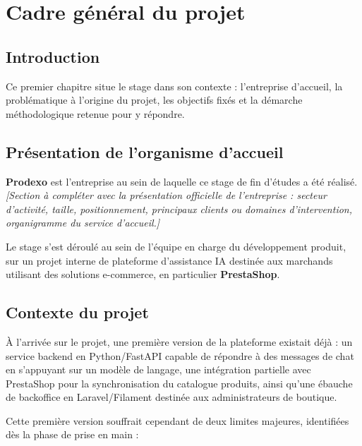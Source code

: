 \chapter{Cadre général du projet}
\label{chap:cadre-general}

\section*{Introduction}

Ce premier chapitre situe le stage dans son contexte : l'entreprise d'accueil, la problématique à l'origine du projet, les objectifs fixés et la démarche méthodologique retenue pour y répondre.

\section{Présentation de l'organisme d'accueil}

\textbf{Prodexo} est l'entreprise au sein de laquelle ce stage de fin d'études a été réalisé. \emph{[Section à compléter avec la présentation officielle de l'entreprise : secteur d'activité, taille, positionnement, principaux clients ou domaines d'intervention, organigramme du service d'accueil.]}

Le stage s'est déroulé au sein de l'équipe en charge du développement produit, sur un projet interne de plateforme d'assistance IA destinée aux marchands utilisant des solutions e-commerce, en particulier \textbf{PrestaShop}.

\section{Contexte du projet}

À l'arrivée sur le projet, une première version de la plateforme existait déjà : un service backend en Python/FastAPI capable de répondre à des messages de chat en s'appuyant sur un modèle de langage, une intégration partielle avec PrestaShop pour la synchronisation du catalogue produits, ainsi qu'une ébauche de backoffice en Laravel/Filament destinée aux administrateurs de boutique.

Cette première version souffrait cependant de deux limites majeures, identifiées dès la phase de prise en main :

